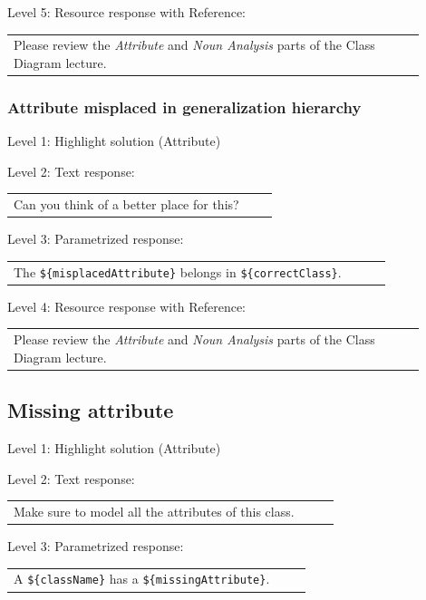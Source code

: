 \noindent Level 5: Resource response with Reference: \medskip

\begin{tabular}{|p{0.9\linewidth}}
Please review the \textit{Attribute} and \textit{Noun Analysis} parts of the Class Diagram lecture.
\end{tabular} \medskip


\subsubsection{Attribute misplaced in generalization hierarchy}

\noindent Level 1: Highlight solution (Attribute) \medskip

\noindent Level 2: Text response: \medskip

\begin{tabular}{|p{0.9\linewidth}}
Can you think of a better place for this?
\end{tabular} \medskip

\noindent Level 3: Parametrized response: \medskip

\begin{tabular}{|p{0.9\linewidth}}
The \verb|${misplacedAttribute}| belongs in \verb|${correctClass}|.
\end{tabular} \medskip

\noindent Level 4: Resource response with Reference: \medskip

\begin{tabular}{|p{0.9\linewidth}}
Please review the \textit{Attribute} and \textit{Noun Analysis} parts of the Class Diagram lecture.
\end{tabular} \medskip


\subsection{Missing attribute}

\noindent Level 1: Highlight solution (Attribute) \medskip

\noindent Level 2: Text response: \medskip

\begin{tabular}{|p{0.9\linewidth}}
Make sure to model all the attributes of this class.
\end{tabular} \medskip

\noindent Level 3: Parametrized response: \medskip

\begin{tabular}{|p{0.9\linewidth}}
A \verb|${className}| has a \verb|${missingAttribute}|.
\end{tabular} \medskip

